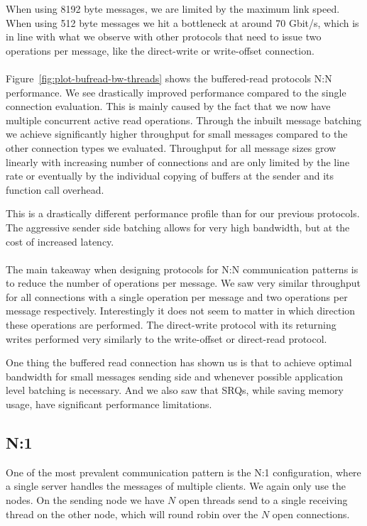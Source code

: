 When using 8192 byte messages, we are limited by the maximum link speed. When using 512 byte messages we hit a bottleneck at
around 70 Gbit/s, which is in line with what we observe with other protocols that need to issue two operations per message, 
like the direct-write or write-offset connection.



\paragraph{} Figure~\ref{fig:plot-bufread-bw-threads} shows the buffered-read protocols N:N performance. We see drastically 
improved performance compared to the single connection evaluation. This is mainly caused by the fact that we now have multiple
concurrent active read operations. Through the inbuilt message batching we achieve  significantly higher throughput for small
messages compared to the other connection types we evaluated. Throughput for all message sizes grow linearly with increasing 
number of connections and are only limited by the line rate or eventually by the individual copying of buffers at the sender 
and its function call overhead.

This is a drastically different performance profile than for our previous protocols. The aggressive sender side batching allows
for very high bandwidth, but at the cost of increased latency.


\paragraph{} The main takeaway when designing protocols for N:N communication patterns is to reduce the number of operations
per message. We saw very similar throughput for all connections with a single operation per message and two operations per
message respectively. Interestingly it does not seem to matter in which direction these operations are performed. The 
direct-write protocol with its returning writes performed very similarly to the write-offset or direct-read protocol.

One thing the buffered read connection has shown us is that to achieve optimal bandwidth for small messages sending side and
whenever possible application level batching is necessary. And we also saw that SRQs, while saving memory usage, have 
significant performance limitations.



\pagebreak
\subsection{N:1}
One of the most prevalent communication pattern is the N:1 configuration, where a single server handles the messages
of multiple clients. We again only use the nodes. On the sending node we have $N$ open threads send to a single receiving
thread on the other node, which will round robin over the $N$ open connections. 

